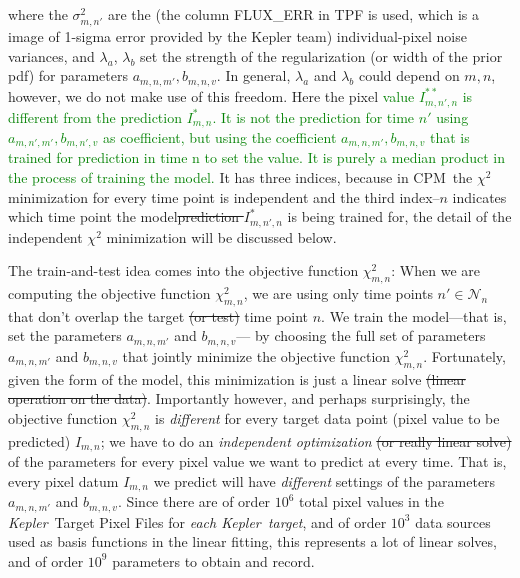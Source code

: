 \documentclass[12pt, preprint]{aastex}
\newcommand{\project}[1]{\textsl{#1}}
\newcommand{\Kepler}{\project{Kepler}}
\newcommand{\name}{CPM}
\newcommand{\set}[1]{\mathcal{#1}}
\newcommand{\revise}[1]{\textcolor{green}{#1}}
\newcommand{\remove}[1]{\sout{#1}}
\begin{document}
where the $\sigma^2_{m,n'}$ are the (the column FLUX\_ERR in TPF is used, which is a image of 1-sigma error provided by the Kepler team) individual-pixel noise variances, and $\lambda_{a}$, 
  $\lambda_{b}$ set the strength of the regularization (or width of the prior pdf) for parameters $a_{m,n,m'}, b_{m,n,v}$. 
  In general, $\lambda_a$ and $\lambda_b$ could depend on $m,n$, however, we do not make use of this freedom. 
  Here the pixel \revise{value $I^{\ast\ast}_{m,n',n}$ is different from the prediction $I^{\ast}_{m,n}$. It is not the prediction for time $n'$ using $a_{m,n',m'}, b_{m,n',v}$ as coefficient, but using the coefficient $a_{m,n,m'}, b_{m,n,v}$ that is trained for prediction in time n to set the value. It is purely a median product in the process of training the model.} It has three indices, 
  because in \name\ the $\chi^2$ minimization for every time
  point is independent and the third index--$n$ indicates 
  which time point the model\remove{prediction $I^{\ast}_{m,n',n}$} is being trained for, 
  the detail of the independent $\chi^2$ minimization will be discussed below.

The train-and-test idea comes into the objective function $\chi^2_{m,n}$:
When we are computing the objective function $\chi^2_{m,n}$,
  we are using only time points $n'\in\set{N}_n$ that don't overlap the target \remove{(or test)} time point $n$.
We train the model---that is, set the parameters $a_{m,n,m'}$ and $b_{m,n,v}$---%
  by choosing the full set of parameters $a_{m,n,m'}$ and $b_{m,n,v}$ 
  that jointly minimize the objective function $\chi^2_{m,n}$.
Fortunately, given the form of the model,
  this minimization is just a linear solve \remove{(linear operation on the data)}.
Importantly however, and perhaps surprisingly, the objective function $\chi^2_{m,n}$ is \emph{different}
  for every target data point (pixel value to be predicted) $I_{m,n}$;
  we have to do an \emph{independent optimization} \remove{(or really linear solve)}
  of the parameters for every pixel value we want to predict at every time.
That is, every pixel datum $I_{m,n}$ we predict will have
  \emph{different} settings of the parameters $a_{m,n,m'}$ and $b_{m,n,v}$.
Since there are of order $10^{6}$ total pixel values in the \Kepler\ Target Pixel Files for \emph{each \Kepler\ target},
  and of order $10^{3}$ data sources used as basis functions in the linear fitting,
  this represents a lot of linear solves, and of order $10^{9}$ parameters to obtain and record.
\end{document}
